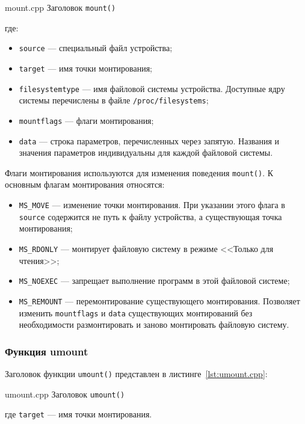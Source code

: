     {mount.cpp}
    {Заголовок \texttt{mount()}}

\noindent где:

\begin{itemize}[label=---]
    \item \texttt{source} --- специальный файл устройства;
    \item \texttt{target} --- имя точки монтирования;
    \item \texttt{filesystemtype} --- имя файловой системы устройства. Доступные ядру системы перечислены в файле \texttt{/proc/filesystems};
    \item \texttt{mountflags} --- флаги монтирования;
    \item \texttt{data} --- строка параметров, перечисленных через запятую. Названия и значения параметров 
    индивидуальны для каждой файловой системы.
\end{itemize}

Флаги монтирования используются для изменения поведения \texttt{mount()}.
К основным флагам монтирования относятся:

\begin{itemize}[label=---]
    \item \texttt{MS\_MOVE} --- изменение точки монтирования. При указании этого флага в \texttt{source}
    содержится не путь к файлу устройства, а существующая точка монтирования;
    \item \texttt{MS\_RDONLY} --- монтирует файловую систему в режиме <<Только для чтения>>;
    \item \texttt{MS\_NOEXEC} --- запрещает выполнение программ в этой файловой системе;
    \item \texttt{MS\_REMOUNT} --- перемонтирование существующего монтирования. Позволяет изменить 
    \texttt{mountflags} и \texttt{data} существующих монтирований без необходимости размонтировать и заново 
    монтировать файловую систему.
\end{itemize}

\subsubsection{Функция umount}

Заголовок функции \texttt{umount()} представлен в листинге~\ref{lst:umount.cpp}: 

    {umount.cpp}
    {Заголовок \texttt{umount()}}

\noindent где \texttt{target} --- имя точки монтирования.

